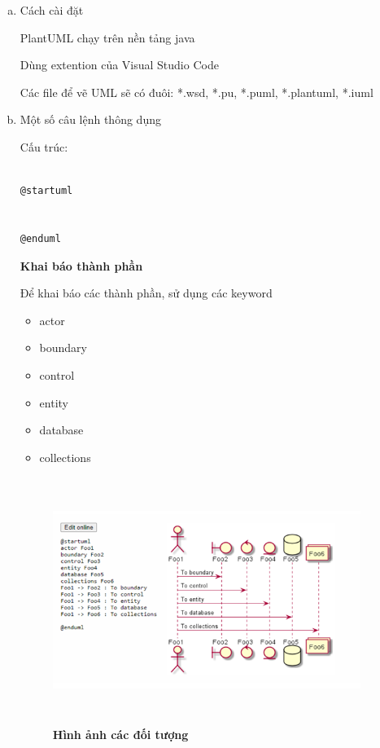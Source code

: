 \begin{enumerate}[a)]
\item Cách cài đặt



PlantUML chạy trên nền tảng java

Dùng extention của Visual Studio Code

Các file để vẽ UML sẽ có đuôi: *.wsd, *.pu, *.puml, *.plantuml, *.iuml


\item  Một số câu lệnh thông dụng


Cấu trúc:

\begin{lstlisting}

@startuml


@enduml

\end{lstlisting}



\textbf{Khai báo thành phần}


Để khai báo các thành phần, sử dụng các keyword

\begin{adjustwidth}{1.5em}{}
\begin{itemize}
  \item	actor
  \item	boundary
  \item	control
  \item	entity
  \item	database
  \item	collections
  
\end{itemize}
\end{adjustwidth}


\begin{figure}[H]
  \centering
  \includegraphics[width=10cm,height=8cm]{Images/appendix/plantuml_object.png}
  \caption[Hình ảnh các đối tượng]{\bfseries \fontsize{12pt}{0pt}
  \selectfont Hình ảnh các đối tượng}
  \label{plantuml_object} %
\end{figure}



\end{enumerate}
